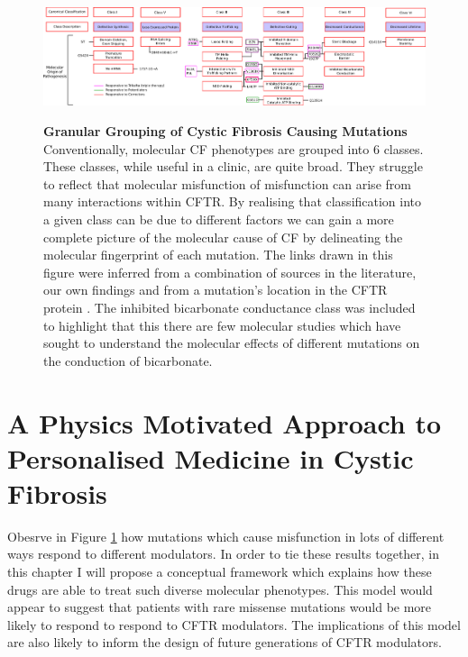 \begin{landscape}
\begin{figure}
	\begin{center}
	\includegraphics[width=1.5\textwidth]{figures/perspective/classes_mutations.pdf}\\
	\end{center}
	\captionsetup{singlelinecheck = false, justification=raggedright}
	\caption[Granular grouping of CF pathogenesis]{\textbf{Granular Grouping of Cystic Fibrosis Causing Mutations}{ Conventionally, molecular CF phenotypes are grouped into 6 classes. These classes, while useful in a clinic, are quite broad. They struggle to reflect that molecular misfunction of misfunction can arise from many interactions within CFTR. By realising that classification into a given class can be due to different factors we can gain a more complete picture of the molecular cause of CF by delineating the molecular fingerprint of each mutation. The links drawn in this figure were inferred from a combination of sources in the literature, our own findings and from a mutation's location in the CFTR protein \cite{bompadre2007, gong2004, wong2022, vangoor2009, vangoor2014, hoffmann2018, thelin2007, gene2008, trikafta_website, phuan2018, ensinck2022}. The inhibited bicarbonate conductance class was included to highlight that this there are few molecular studies which have sought to understand the molecular effects of different mutations on the conduction of bicarbonate. }
	}

	\label{granular_classification}
\end{figure}
\end{landscape}

\section{A Physics Motivated Approach to Personalised Medicine in Cystic Fibrosis}
Obesrve in Figure \ref{granular_classification} how mutations which cause misfunction in lots of different ways respond to different modulators. In order to tie these results together, in this chapter I will propose a conceptual framework which explains how these drugs are able to treat such diverse molecular phenotypes. This model would appear to suggest that patients with rare missense mutations would be more likely to respond to respond to CFTR modulators. The implications of this model are also likely to inform the design of future generations of CFTR modulators. 

